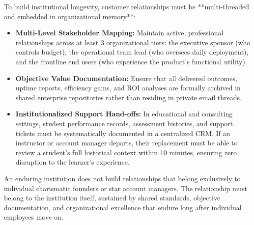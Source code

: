 To build institutional longevity, customer relationships must be **multi-threaded and embedded in organizational memory**:
\begin{itemize}[leftmargin=*]
\item \textbf{Multi-Level Stakeholder Mapping:} Maintain active, professional relationships across at least 3 organizational tiers: the executive sponsor (who controls budget), the operational team lead (who oversees daily deployment), and the frontline end users (who experience the product's functional utility).
\item \textbf{Objective Value Documentation:} Ensure that all delivered outcomes, uptime reports, efficiency gains, and ROI analyses are formally archived in shared enterprise repositories rather than residing in private email threads.
\item \textbf{Institutionalized Support Hand-offs:} In educational and consulting settings, student performance records, assessment histories, and support tickets must be systematically documented in a centralized CRM. If an instructor or account manager departs, their replacement must be able to review a student's full historical context within 10 minutes, ensuring zero disruption to the learner's experience.
\end{itemize}

An enduring institution does not build relationships that belong exclusively to individual charismatic founders or star account managers. The relationship must belong to the institution itself, sustained by shared standards, objective documentation, and organizational excellence that endure long after individual employees move on.
